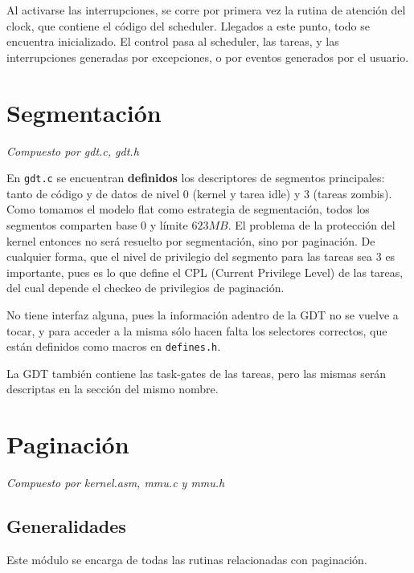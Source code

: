 \documentclass{article}
\begin{document}
	Al activarse las interrupciones, se corre por primera vez la rutina de atención del clock, que contiene el código del scheduler. Llegados a este punto, todo se encuentra inicializado. El control pasa al scheduler, las tareas, y las interrupciones generadas por excepciones, o por eventos generados por el usuario.


	\section{Segmentación}
	\vspace{-1cm}
	\begin{flushright}
	\textit{Compuesto por gdt.c, gdt.h}
	\end{flushright}

	En \texttt{gdt.c} se encuentran \textbf{definidos} los descriptores de segmentos principales: tanto de código y de datos de nivel 0 (kernel y tarea idle) y 3 (tareas zombis). Como tomamos el modelo flat como estrategia de segmentación, todos los segmentos comparten base $0$ y límite $623MB$. El problema de la protección del kernel entonces no será resuelto por segmentación, sino por paginación. De cualquier forma, que el nivel de privilegio del segmento para las tareas sea 3 es importante, pues es lo que define el CPL (Current Privilege Level) de las tareas, del cual depende el checkeo de privilegios de paginación.

	No tiene interfaz alguna, pues la información adentro de la GDT no se vuelve a tocar, y para acceder a la misma sólo hacen falta los selectores correctos, que están definidos como macros en \texttt{defines.h}.

	La GDT también contiene las task-gates de las tareas, pero las mismas serán descriptas en la sección del mismo nombre.


	\section{Paginación}
	\vspace{-1cm}
	\begin{flushright}
	\textit{Compuesto por kernel.asm, mmu.c y mmu.h}
	\end{flushright}

	\subsection*{Generalidades}

	Este módulo se encarga de todas las rutinas relacionadas con paginación.
\end{document}
